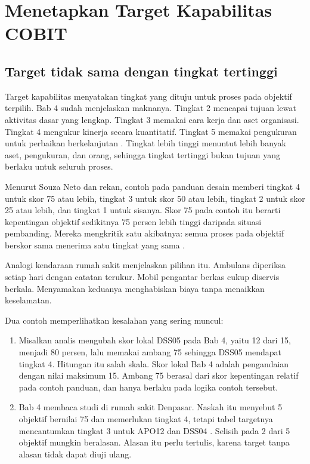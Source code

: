 \section{Menetapkan Target Kapabilitas COBIT}

\subsection*{Target tidak sama dengan tingkat tertinggi}

Target kapabilitas menyatakan tingkat yang dituju untuk proses pada objektif terpilih. Bab 4
sudah menjelaskan maknanya. Tingkat 2 mencapai tujuan lewat aktivitas dasar yang lengkap.
Tingkat 3 memakai cara kerja dan aset organisasi. Tingkat 4 mengukur kinerja secara kuantitatif.
Tingkat 5 memakai pengukuran untuk perbaikan berkelanjutan \cite{c04-kapabilitas}. Tingkat lebih
tinggi menuntut lebih banyak aset, pengukuran, dan orang, sehingga tingkat tertinggi bukan
tujuan yang berlaku untuk seluruh proses.

Menurut Souza Neto dan rekan, contoh pada panduan desain memberi tingkat 4 untuk skor 75 atau
lebih, tingkat 3 untuk skor 50 atau lebih, tingkat 2 untuk skor 25 atau lebih, dan tingkat 1
untuk sisanya. Skor 75 pada contoh itu berarti kepentingan objektif sedikitnya 75 persen lebih
tinggi daripada situasi pembanding. Mereka mengkritik satu akibatnya: semua proses pada objektif
berskor sama menerima satu tingkat yang sama \cite{c04-kapabilitas}.

Analogi kendaraan rumah sakit menjelaskan pilihan itu. Ambulans diperiksa setiap hari dengan
catatan terukur. Mobil pengantar berkas cukup diservis berkala. Menyamakan keduanya menghabiskan
biaya tanpa menaikkan keselamatan.

Dua contoh memperlihatkan kesalahan yang sering muncul:
\begin{enumerate}
  \item Misalkan analis mengubah skor lokal DSS05 pada Bab 4, yaitu 12 dari 15, menjadi 80
  persen, lalu memakai ambang 75 sehingga DSS05 mendapat tingkat 4. Hitungan itu salah skala.
  Skor lokal Bab 4 adalah pengandaian dengan nilai maksimum 15. Ambang 75 berasal dari skor
  kepentingan relatif pada contoh panduan, dan hanya berlaku pada logika contoh tersebut.
  \item Bab 4 membaca studi di rumah sakit Denpasar. Naskah itu menyebut 5 objektif bernilai 75
  dan memerlukan tingkat 4, tetapi tabel targetnya mencantumkan tingkat 3 untuk APO12 dan DSS04
  \cite{c04-denpasar}. Selisih pada 2 dari 5 objektif mungkin beralasan. Alasan itu perlu
  tertulis, karena target tanpa alasan tidak dapat diuji ulang.
\end{enumerate}

